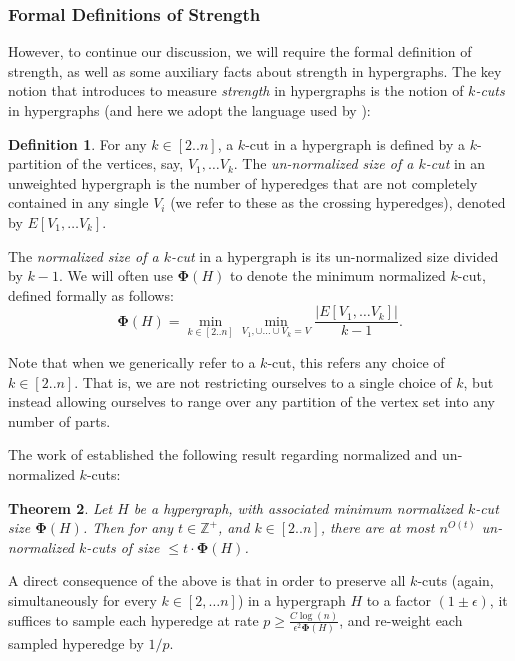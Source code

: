 \documentclass[11pt]{article}
\newtheorem{theorem}{Theorem}[section]
\theoremstyle{definition}
\newtheorem{definition}[theorem]{Definition}
\newcommand{\Z}{\mathbb{Z}}
\newcommand{\eps}{\epsilon}
\newcommand{\minkcut}{\mathbf{\Phi}}
\begin{document}
\subsubsection{Formal Definitions of Strength}

However, to continue our discussion, we will require the formal definition of strength, as well as some auxiliary facts about  strength in hypergraphs. The key notion that \cite{Qua23} introduces to measure \emph{strength} in hypergraphs is the notion of \emph{$k$-cuts} in hypergraphs (and here we adopt the language used by \cite{KPS24d}):

\begin{definition}\label{def:minkcut}
   For any $k \in [2..n]$, a $k$-cut in a hypergraph is defined by a $k$-partition of the vertices, say, $V_1, \dots V_k$. The \emph{un-normalized size of a $k$-cut} in an unweighted hypergraph is the number of hyperedges that are not completely contained in any single $V_i$ (we refer to these as the crossing hyperedges), denoted by $E[V_1, \dots V_k]$.

    The \emph{normalized size of a $k$-cut} in a hypergraph is its un-normalized size divided by $k-1$. We will often use $\minkcut(H)$ to denote the minimum normalized $k$-cut, defined formally as follows:
    \[
    \minkcut(H) = \min_{k \in [2..n]} \min_{V_1, \cup  \dots \cup V_k = V} \frac{|E[V_1, \dots V_k]|}{k-1}.
    \]
\end{definition}

Note that when we generically refer to a $k$-cut, this refers any choice of $k \in [2..n]$. That is, we are not restricting ourselves to a single choice of $k$, but instead allowing ourselves to range over any partition of the vertex set into any number of parts. 

The work of \cite{Qua23} established the following result regarding normalized and un-normalized $k$-cuts:

\begin{theorem}\cite{Qua23}
    Let $H$ be a hypergraph, with associated minimum normalized $k$-cut size $\minkcut(H)$. Then for any $t \in \Z^{+}$, and $k \in [2..n]$, there are at most $n^{O(t)}$ un-normalized $k$-cuts of size $\leq t \cdot \minkcut(H)$.
\end{theorem}

A direct consequence of the above is that in order to preserve all $k$-cuts (again, simultaneously for every $k \in [2, \dots n]$) in a hypergraph $H$ to a factor $(1 \pm \eps)$, it suffices to sample each hyperedge at rate $p \geq \frac{C \log(n)}{\eps^2 \minkcut(H)}$, and re-weight each sampled hyperedge by $1/p$. 
\end{document}
